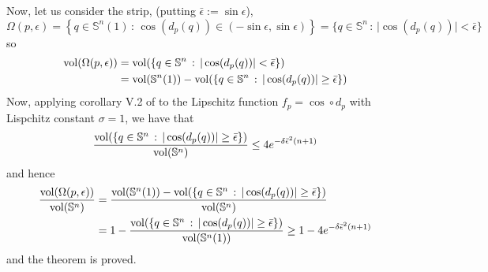 \documentclass{amsart}
\theoremstyle{definition}
\theoremstyle{remark}
\newcommand{\ese}{\mathbb{S}}
\begin{document}
Now, let us consider the strip, (putting $\bar \epsilon:= \sin \epsilon$),
$$\Omega(p,\epsilon)=\left\lbrace q\in \mathbb{S}^{n}(1)\, : \,   \cos\left(d_p(q)\right)\in ( -\sin\epsilon,\sin\epsilon) \right\rbrace=\{q\in \mathbb{S}^n\, : \, \vert \cos(d_p(q))\vert < \bar\epsilon \}$$
\noindent  so
$$\begin{aligned}
{\rm vol}(\Omega(p, \epsilon))&={\rm vol}(\{q\in \mathbb{S}^n\, : \, \vert \cos(d_p(q))\vert < \bar\epsilon \})\\&={\rm vol}(\ese^n(1))-{\rm vol}(\{q\in \mathbb{S}^n\, : \, \vert \cos(d_p(q))\vert \geq \bar\epsilon \})
\end{aligned}$$
Now, applying corollary V.2 of \cite{MS}  to the Lipschitz function $f_p=\cos\circ d_p$ with Lispchitz constant $\sigma=1$, we have that 
$$\frac{{\rm vol}(\{q\in \mathbb{S}^n\, : \, \vert \cos(d_p(q))\vert \geq \bar\epsilon \})}{{\rm vol}(\mathbb{S}^n)}\leq 4 e^{-\delta\bar\epsilon^2(n+1)}$$
\noindent  and hence
$$
\begin{aligned}
\frac{{\rm vol}(\Omega(p,\epsilon))}{{\rm vol}(\mathbb{S}^n)}&=\frac{ {\rm vol}(\ese^n(1))-{\rm vol}(\{q\in \mathbb{S}^n\, : \, \vert \cos(d_p(q))\vert \geq \bar\epsilon \})}{{\rm vol}(\mathbb{S}^n) }\\&=1-\frac{{\rm vol}(\{q\in \mathbb{S}^n\, : \, \vert \cos(d_p(q))\vert \geq \bar\epsilon \}) }{ {\rm vol}(\ese^n(1))}\geq 1-4e^{-\delta \bar\epsilon^2(n+1)}
\end{aligned}
$$
and the theorem is proved.
\end{document}
